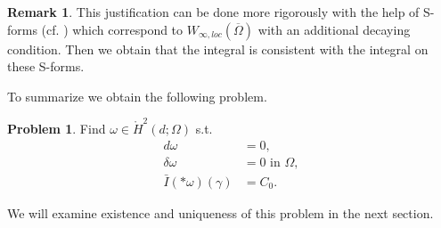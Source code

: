 \documentclass[12pt,a4paper]{article}
\theoremstyle{definition}
\newtheorem{remark}{Remark}
\newtheorem{problem}{Problem}
\newcommand{\omegabar}{\overline{\Omega}}
\newcommand{\real}{\mathbb{R}}
\begin{document}
\begin{remark}
    This justification can be done more rigorously with the help of S-forms
    (cf. \cite{goldshtein}) which correspond to $W_{\infty,loc}(\omegabar)$
    with an additional decaying condition. Then we obtain that the integral 
    is consistent with the integral on these S-forms.
\end{remark}
\noindent To summarize we obtain the following problem.

\begin{problem}
    Find $\omega \in \mathring{H}^2(d;\Omega)$ s.t.
    \begin{align*}
        d \omega &= 0, \\
        \delta \omega &= 0 \text{ in $\Omega$}, \\
        \bar{I}(*\omega)(\gamma)  &= C_0.
    \end{align*}
\end{problem}
\noindent We will examine existence and 
uniqueness of this problem in the next section.


\end{document}
